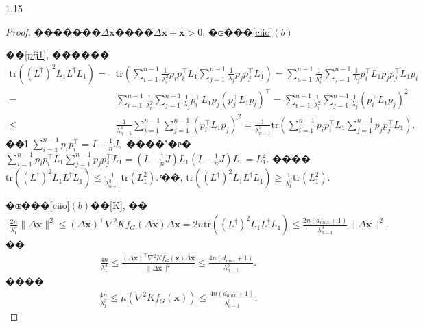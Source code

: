 \documentclass[preprint,12pt]{elsarticle1}
\numberwithin{equation}{section}
\begin{document}
\begin{spacing}{1.15}
\begin{proof}
{�������$\Delta \textbf{x}$����$\Delta \textbf{x}+\textbf{x}>0$, �ɶ���\ref{ciio}$(b)$

��\eqref{pfj1},
������
\begin{align}\nonumber
\textrm{tr} ( (L^\dag)^{2} L_{1} L^\dag L_{1})
=&\textrm{tr} \left(\sum_{i=1}^{n-1}
\frac{1}{\lambda_i^2} p_i p_i^{\top} L_{1} \sum_{j=1}^{n-1}\frac{1}{\lambda_j} p_j p_j^{\top}  L_{1} \right)= \sum_{i=1}^{n-1} \frac{1}{\lambda_i^2}  \sum_{j=1}^{n-1}\frac{1}{\lambda_j} p_i^{\top}  L_{1}p_j p_j^{\top} L_{1}p_i\\ \nonumber
=&\sum_{i=1}^{n-1} \frac{1}{\lambda_i^2}  \sum_{j=1}^{n-1}\frac{1}{\lambda_j}
  p_i^{\top}  L_{1}p_j (p_j^{\top} L_{1}p_i)^{\top}
= \sum_{i=1}^{n-1} \frac{1}{\lambda_i^2}  \sum_{j=1}^{n-1}\frac{1}{\lambda_j}( p_i^{\top} L_{1} p_j)^{2}
\\ \nonumber
\leq&   \frac{1}{\lambda_{n-1}^3}\sum_{i=1}^{n-1} \sum_{j=1}^{n-1}( p_i^{\top} L_{1} p_j)^{2}=\frac{1}{\lambda_{n-1}^3}\textrm{tr}\left(\sum_{i=1}^{n-1}
p_i p_i^{\top} L_{1} \sum_{j=1}^{n-1}  p_j p_j^{\top}  L_{1}\right).
\end{align}
 ��Ϊ
$\sum_{i=1}^{n-1}p_{i}p_{i}^{\top}
=I-\frac{1}{n}J,$ ����ʽ�е�$\sum_{i=1}^{n-1}p_i p_i^{\top} L_{1} \sum_{j=1}^{n-1}  p_j p_j^{\top}  L_{1}=(I-\frac{1}{n}J)L_{1}(I-\frac{1}{n}J)L_{1}=L_{1}^{2}.$
����$\textrm{tr} ( (L^\dag)^{2} L_{1} L^\dag L_{1})\leq\frac{1}{\lambda_{n-1}^3}\textrm{tr}(L_{1}^{2}).
$ ͬ��, $\textrm{tr} ( (L^\dag)^{2} L_{1} L^\dag L_{1})\geq\frac{1}{\lambda_{1}^3}\textrm{tr}(L_{1}^{2}).$

�ɶ���\ref{ciio}$(b)$��\eqref{K}, ��
\begin{align}\nonumber
\frac{2n}{\lambda_{1}^3}\|\Delta \textbf{x}\|^{2}\leq(\Delta \mathbf{x})^{\top} \nabla^{2} Kf_{G}(\Delta \mathbf{x}) \Delta \mathbf{\mathbf{x}}=2n\textrm{tr} ( (L^\dag)^{2} L_{1} L^\dag L_{1})\leq\frac{2n(d_{max}+1)}{\lambda_{n-1}^3}\|\Delta \textbf{x}\|^{2}.
\end{align}
��
\begin{align}\nonumber
\frac{4n}{\lambda_{1}^{3}}\leq \frac{(\Delta \textbf{x})^{\top} \nabla^{2} Kf_{G}(\textbf{x})\Delta \textbf{x}}{\|\Delta \textbf{x} \|^{2}} \leq \frac{4n(d_{max}+1)}{\lambda_{n-1}^3}.
\end{align}
����\begin{align}
\nonumber
\frac{4n}{\lambda_{1}^{3}}\leq \mu(\nabla^{2}Kf_{G}(\mathbf{x}))\leq \frac{4n(d_{max}+1)}{\lambda_{n-1}^3}.\end{align}}\fi


\end{proof}
\end{spacing}
\end{document}
